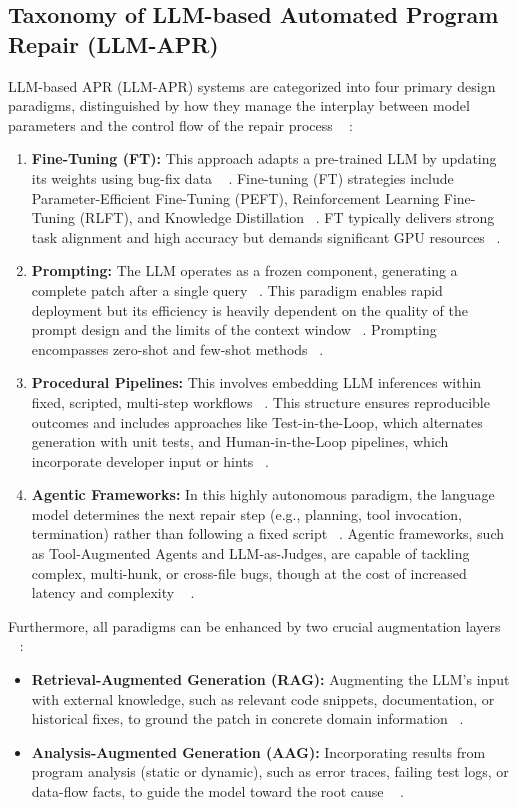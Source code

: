 \subsection*{Taxonomy of LLM-based Automated Program Repair (LLM-APR)}
LLM-based APR (LLM-APR) systems are categorized into four primary design paradigms, distinguished by how they manage the interplay between model parameters and the control flow of the repair process ~\cite{yang2025}
:
\begin{enumerate} \item \textbf{Fine-Tuning (FT):} This approach adapts a pre-trained LLM by updating its weights using bug-fix data ~\cite{yang2025}
. Fine-tuning (FT) strategies include Parameter-Efficient Fine-Tuning (PEFT), Reinforcement Learning Fine-Tuning (RLFT), and Knowledge Distillation ~\cite{yang2025}. FT typically delivers strong task alignment and high accuracy but demands significant GPU resources ~\cite{yang2025}. \item \textbf{Prompting:} The LLM operates as a frozen component, generating a complete patch after a single query ~\cite{yang2025}. This paradigm enables rapid deployment but its efficiency is heavily dependent on the quality of the prompt design and the limits of the context window ~\cite{yang2025}. Prompting encompasses zero-shot and few-shot methods ~\cite{yang2025}. \item \textbf{Procedural Pipelines:} This involves embedding LLM inferences within fixed, scripted, multi-step workflows ~\cite{yang2025}. This structure ensures reproducible outcomes and includes approaches like Test-in-the-Loop, which alternates generation with unit tests, and Human-in-the-Loop pipelines, which incorporate developer input or hints ~\cite{yang2025}. \item \textbf{Agentic Frameworks:} In this highly autonomous paradigm, the language model determines the next repair step (e.g., planning, tool invocation, termination) rather than following a fixed script ~\cite{yang2025}. Agentic frameworks, such as Tool-Augmented Agents and LLM-as-Judges, are capable of tackling complex, multi-hunk, or cross-file bugs, though at the cost of increased latency and complexity ~\cite{yang2025}
. \end{enumerate}
Furthermore, all paradigms can be enhanced by two crucial augmentation layers ~\cite{yang2025}
: \begin{itemize} \item \textbf{Retrieval-Augmented Generation (RAG):} Augmenting the LLM's input with external knowledge, such as relevant code snippets, documentation, or historical fixes, to ground the patch in concrete domain information ~\cite{yang2025}. \item \textbf{Analysis-Augmented Generation (AAG):} Incorporating results from program analysis (static or dynamic), such as error traces, failing test logs, or data-flow facts, to guide the model toward the root cause ~\cite{yang2025}
. \end{itemize}
